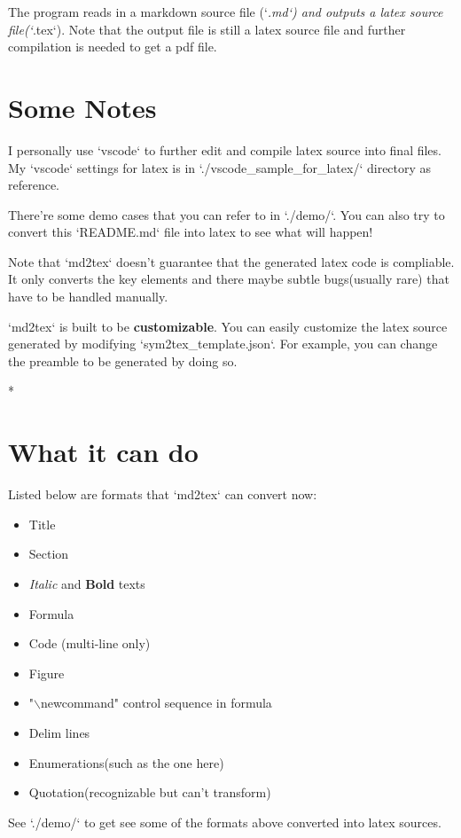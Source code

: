 \documentclass[UTF8]{ctexart}
\begin{document}
The program reads in a markdown source file (`\emph{.md`) and outputs a latex source file(`}.tex`). Note that the output file is still a latex source file and further compilation is needed to get a pdf file. 

\section{Some Notes}

I personally use `vscode` to further edit and compile latex source into final files. My `vscode` settings for latex is in `./vscode\_sample\_for\_latex/` directory as reference.

There're some demo cases that you can refer to in `./demo/`. You can also try to convert this `README.md` file into latex to see what will happen!

Note that `md2tex` doesn't guarantee that the generated latex code is compliable. It only converts the key elements and there maybe subtle bugs(usually rare) that have to be handled manually.

`md2tex` is built to be \textbf{customizable}.  You can easily customize the latex source generated by modifying `sym2tex\_template.json`. For example, you can change the preamble to be generated by doing so.

\begin{center}
	*\quad*\quad*
\end{center}

\section{What it can do}

Listed below are formats that `md2tex` can convert now:

\begin{itemize}	\item Title
	\item Section
	\item \emph{Italic} and \textbf{Bold} texts
	\item Formula
	\item Code (multi-line only)
	\item Figure
	\item "$\backslash$newcommand" control sequence in formula
	\item Delim lines
	\item Enumerations(such as the one here)
	\item Quotation(recognizable but can't transform)
\end{itemize}
See `./demo/` to get see some of the formats above converted into latex sources.
\end{document}
